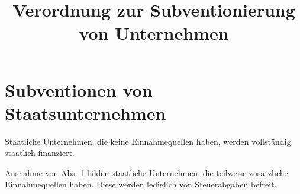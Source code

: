 \documentclass{sasbase}
\begin{document}
\title{Verordnung zur Subventionierung von Unternehmen}

\setcounter{secnumdepth}{5}

\mytitle

\parensstyle

\section{Subventionen von Staatsunternehmen}

\begin{lawparagraph}[Subventionierung]
	\item Staatliche Unternehmen, die keine Einnahmequellen haben, werden vollständig staatlich
        finanziert.
    \item Ausnahme von Abs. 1 bilden staatliche Unternehmen, die teilweise zusätzliche
        Einnahmequellen haben. Diese werden lediglich von Steuerabgaben befreit.
\end{lawparagraph}
\end{document}
